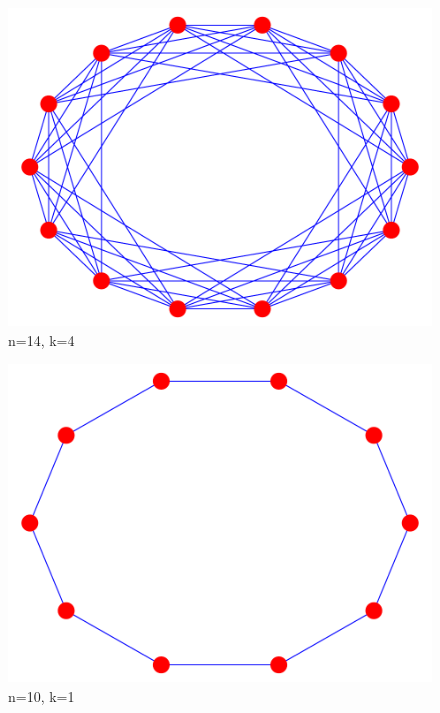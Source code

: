 \documentclass[11pt]{article}
\begin{document}
\begin{figure}[h]
    \centering
    \includegraphics[trim={0 0 0 0},clip, scale=0.9]{n14k4.pdf}
    \caption{n=14, k=4}
    \label{fig:figure-4}
\end{figure}

\begin{figure}[h]
    \centering
    \includegraphics[trim={0 0 0 0},clip, scale=0.9]{n10k1.pdf}
    \caption{n=10, k=1}
    \label{fig:figure-4}
\end{figure}
\end{document}
